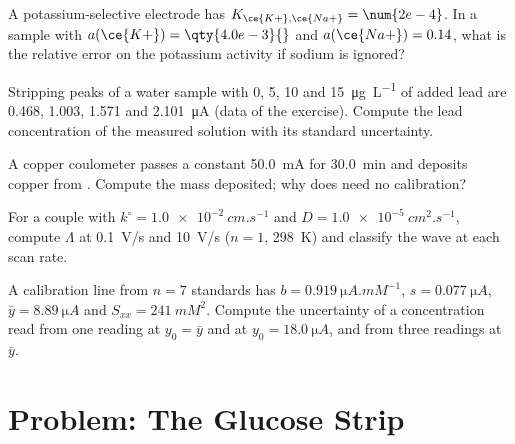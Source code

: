 \begin{exercise}[$\star\star$]\label{exo:b3:electrode-kinetics:8}
A potassium-selective electrode has $K_{\ce{K+},\ce{Na+}} = \num{2e-4}$. In a sample with $a(\ce{K+}) =
\qty{4.0e-3}{}$ and $a(\ce{Na+}) = 0.14$, what is the relative error on the potassium activity if
sodium is ignored?
\end{exercise}

\begin{exercise}[$\star\star$]\label{exo:b3:electrode-kinetics:9}
Stripping peaks of a water sample with 0, 5, 10 and \qty{15}{\micro g.L^{-1}} of added
lead are 0.468, 1.003, 1.571 and \qty{2.101}{\micro A} (data of the exercise). Compute the
lead concentration of the measured solution with its standard uncertainty.
\end{exercise}

\begin{exercise}[$\star\star\star$]\label{exo:b3:electrode-kinetics:10}
A copper coulometer passes a constant \qty{50.0}{mA} for \qty{30.0}{min} and deposits copper
from . Compute the mass deposited; why does  need no
calibration?
\end{exercise}

\begin{exercise}[$\star\star\star$]\label{exo:b3:electrode-kinetics:11}
For a couple with $k^\circ = \qty{1.0e-2}{cm.s^{-1}}$ and $D = \qty{1.0e-5}{cm^2.s^{-1}}$, compute $\Lambda$ at \qty{0.1}{V/s}
and \qty{10}{V/s} ($n = 1$, \qty{298}{K}) and classify the wave at each scan rate.
\end{exercise}

\begin{exercise}[$\star\star\star$]\label{exo:b3:electrode-kinetics:12}
A calibration line from $n = 7$ standards has $b = \qty{0.919}{\micro A.mM^{-1}}$, $s = \qty{0.077}{\micro A}$,
$\bar y = \qty{8.89}{\micro A}$ and $S_{xx} = \qty{241}{mM^2}$. Compute the uncertainty of a concentration read
from one reading at $y_0 = \bar y$ and at $y_0 = \qty{18.0}{\micro A}$, and from three readings at $\bar y$.
\end{exercise}

\section{Problem: The Glucose Strip}


